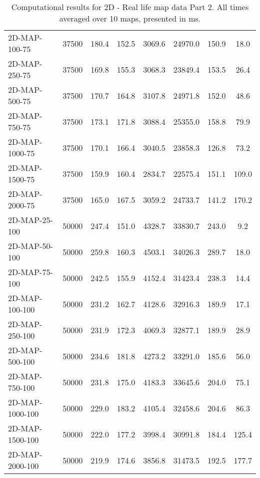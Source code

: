 \documentclass{article}
\begin{document}
\begin{table}[h]
\begin{center}
\begin{tabular}{|l||c|c|c|c|c|c|c|}
            2D-MAP-100-75                  & 37500 & 180.4     & 152.5      & 3069.6      & 24970.0  & 150.9     & 18.0       \\
            2D-MAP-250-75                  & 37500 & 169.8     & 155.3      & 3068.3      & 23849.4  & 153.5     & 26.4       \\
            2D-MAP-500-75                  & 37500 & 170.7     & 164.8      & 3107.8      & 24971.8  & 152.0     & 48.6       \\
            2D-MAP-750-75                  & 37500 & 173.1     & 171.8      & 3088.4      & 25355.0  & 158.8     & 79.9       \\
            2D-MAP-1000-75                 & 37500 & 170.1     & 166.4      & 3040.5      & 23858.3  & 126.8     & 73.2       \\
            2D-MAP-1500-75                 & 37500 & 159.9     & 160.4      & 2834.7      & 22575.4  & 151.1     & 109.0      \\
            2D-MAP-2000-75                 & 37500 & 165.0     & 167.5      & 3059.2      & 24733.7  & 141.2     & 170.2      \\
            \hline
            2D-MAP-25-100                  & 50000 & 247.4     & 151.0      & 4328.7      & 33830.7  & 243.0     & 9.2        \\
            2D-MAP-50-100                  & 50000 & 259.8     & 160.3      & 4503.1      & 34026.3  & 289.7     & 18.0       \\
            2D-MAP-75-100                  & 50000 & 242.5     & 155.9      & 4152.4      & 31423.4  & 238.3     & 14.4       \\
            2D-MAP-100-100                 & 50000 & 231.2     & 162.7      & 4128.6      & 32916.3  & 189.9     & 17.1       \\
            2D-MAP-250-100                 & 50000 & 231.9     & 172.3      & 4069.3      & 32877.1  & 189.9     & 28.9       \\
            2D-MAP-500-100                 & 50000 & 234.6     & 181.8      & 4273.2      & 33291.0  & 185.6     & 56.0       \\
            2D-MAP-750-100                 & 50000 & 231.8     & 175.0      & 4183.3      & 33645.6  & 204.0     & 75.1       \\
            2D-MAP-1000-100                & 50000 & 229.0     & 183.2      & 4105.4      & 32458.6  & 204.6     & 86.3       \\
            2D-MAP-1500-100                & 50000 & 222.0     & 177.2      & 3998.4      & 30991.8  & 184.4     & 125.4      \\
            2D-MAP-2000-100                & 50000 & 219.9     & 174.6      & 3856.8      & 31473.5  & 192.5     & 177.7      \\
            \hline
        \end{tabular}
        \caption{Computational results for 2D - Real life map data Part 2. All times averaged over 10 maps, presented in ms.}
    \end{center}
    \end{table}
\end{document}
